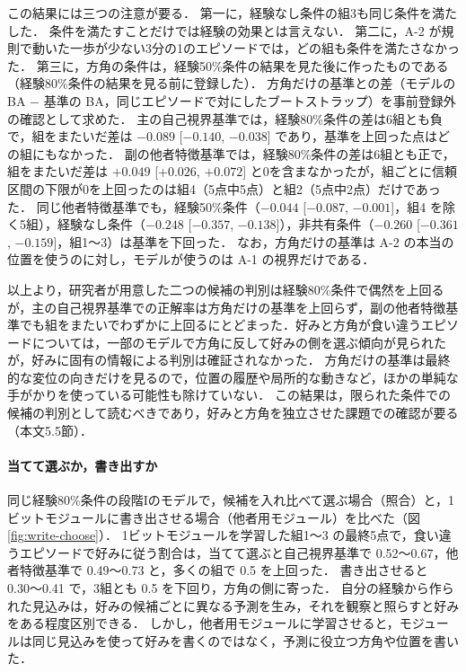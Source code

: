 この結果には三つの注意が要る．
第一に，経験なし条件の組3も同じ条件を満たした．
条件を満たすことだけでは経験の効果とは言えない．
第二に，A-2 が規則で動いた一歩が少ない3分の1のエピソードでは，どの組も条件を満たさなかった．
第三に，方角の条件は，経験50\%条件の結果を見た後に作ったものである（経験80\%条件の結果を見る前に登録した）．
方角だけの基準との差（モデルの BA $-$ 基準の BA，同じエピソードで対にしたブートストラップ）を事前登録外の確認として求めた．
主の自己視界基準では，経験80\%条件の差は6組とも負で，組をまたいだ差は $-0.089$ [$-0.140$, $-0.038$] であり，基準を上回った点はどの組にもなかった．
副の他者特徴基準では，経験80\%条件の差は6組とも正で，組をまたいだ差は $+0.049$ [$+0.026$, $+0.072$] と0を含まなかったが，組ごとに信頼区間の下限が0を上回ったのは組4（5点中5点）と組2（5点中2点）だけであった．
同じ他者特徴基準でも，経験50\%条件（$-0.044$ [$-0.087$, $-0.001$]，組4 を除く5組），経験なし条件（$-0.248$ [$-0.357$, $-0.138$]），非共有条件（$-0.260$ [$-0.361$, $-0.159$]，組1〜3）は基準を下回った．
なお，方角だけの基準は A-2 の本当の位置を使うのに対し，モデルが使うのは A-1 の視界だけである．

以上より，研究者が用意した二つの候補の判別は経験80\%条件で偶然を上回るが，主の自己視界基準での正解率は方角だけの基準を上回らず，副の他者特徴基準でも組をまたいでわずかに上回るにとどまった．好みと方角が食い違うエピソードについては，一部のモデルで方角に反して好みの側を選ぶ傾向が見られたが，好みに固有の情報による判別は確証されなかった．
方角だけの基準は最終的な変位の向きだけを見るので，位置の履歴や局所的な動きなど，ほかの単純な手がかりを使っている可能性も除けていない．
この結果は，限られた条件での候補の判別として読むべきであり，好みと方角を独立させた課題での確認が要る（本文5.5節）．

\paragraph{当てて選ぶか，書き出すか}
同じ経験80\%条件の段階Iのモデルで，候補を入れ比べて選ぶ場合（照合）と，1ビットモジュールに書き出させる場合（他者用モジュール）を比べた（図\ref{fig:write-choose}）．
1ビットモジュールを学習した組1〜3 の最終5点で，食い違うエピソードで好みに従う割合は，当てて選ぶと自己視界基準で 0.52〜0.67，他者特徴基準で 0.49〜0.73 と，多くの組で 0.5 を上回った．
書き出させると 0.30〜0.41 で，3組とも 0.5 を下回り，方角の側に寄った．
自分の経験から作られた見込みは，好みの候補ごとに異なる予測を生み，それを観察と照らすと好みをある程度区別できる．
しかし，他者用モジュールに学習させると，モジュールは同じ見込みを使って好みを書くのではなく，予測に役立つ方角や位置を書いた．

